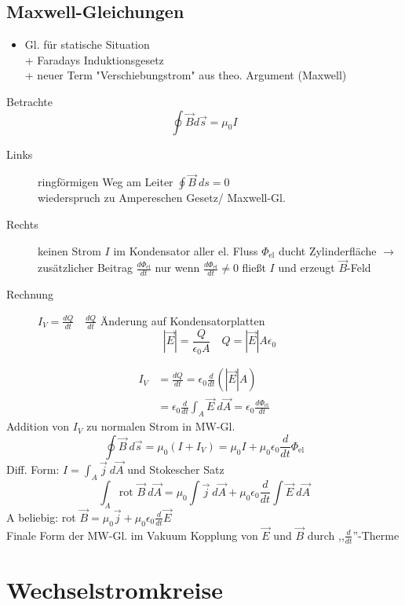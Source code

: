 \documentclass[titlepage,12pt,a4paper,ngerman]{report}
\newcommand{\tx}[1]{\textrm{#1}}
\begin{document}
\subsection{Maxwell-Gleichungen}
\begin{itemize}
	\item Gl. für statische Situation\\
	+ Faradays Induktionsgesetz\\
	+ neuer Term "Verschiebungstrom" aus theo. Argument (Maxwell)
\end{itemize}
Betrachte $$\oint \vec{B}d \vec{s} = \mu_0 I$$
\begin{description}
	\item [Links] ringförmigen Weg am Leiter $\oint \vec{B}\ ds = 0$\\
	wiederspruch zu Ampereschen Gesetz/ Maxwell-Gl.
	\item [Rechts] keinen Strom $I$ im Kondensator aller el. Fluss $\Phi_{\tx{el}}$ ducht Zylinderfläche $\rightarrow$ zusätzlicher Beitrag $\frac{d \Phi_\tx{el}}{dt}$ nur wenn $\frac{d \Phi_\tx{el}}{dt} \neq 0$ fließt $I$ und erzeugt $\vec{B}$-Feld
	\item [Rechnung] $I_V = \frac{dQ}{dt} \quad \frac{dQ}{dt}$ Änderung auf Kondensatorplatten
	$$|\vec{E}| = \frac{Q}{\epsilon_0 A} \quad Q = |\vec{E}|A\epsilon_0$$ 
\end{description}
\begin{align*}
	I_V &= \frac{dQ}{dt} = \epsilon_0 \frac{d}{dt} (|\vec{E}|A)\\
	&= \epsilon_0 \frac{d}{dt} \int_A \vec{E}\ d\vec{A} = \epsilon_0 \frac{d \Phi_{\tx{el}}}{dt}
\end{align*}
Addition von $I_V$ zu normalen Strom in MW-Gl.
$$\boxed{\oint \vec{B}\ d\vec{s} = \mu_0 (I +I_V) = \mu_0 I + \mu_0 \epsilon_0 \frac{d}{dt}\Phi_{\tx{el}}}$$
Diff. Form: $ I = \int_A \vec{j}\ d\vec{A}$ und Stokescher Satz
$$\int_A \tx{rot } \vec{B}\ d\vec{A} = \mu_0 \int \vec{j}\ d \vec{A} + \mu_0 \epsilon_0 \frac{d}{dt} \int \vec{E}\ d\vec{A}$$
A beliebig: rot $\vec{B} = \mu_0 \vec{j} + \mu_0 \epsilon_0 \frac{d}{dt}\vec{E}$\\
Finale Form der MW-Gl. im Vakuum Kopplung von $\vec{E}$ und $\vec{B}$ durch ,,$\frac{d}{dt}$''-Therme

\section{Wechselstromkreise}
\end{document}
